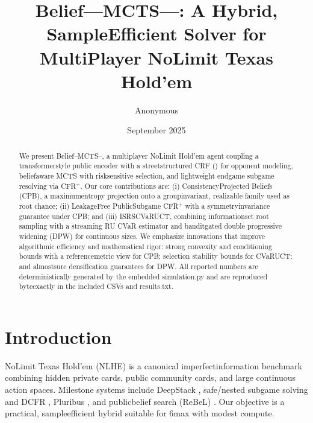 \title{Belief---MCTS---\sCRF: A Hybrid, Sample\textendash Efficient Solver for Multi\textendash Player No\textendash Limit Texas Hold'em}
\author{Anonymous}
\date{September 2025}


\maketitle

\begin{abstract}
We present Belief--MCTS--\sCRF, a multi\textendash player No\textendash Limit Hold'em agent coupling a transformer\textendash style public encoder with a street\textendash structured CRF (\sCRF) for opponent modeling, belief\textendash aware MCTS with risk\textendash sensitive selection, and lightweight endgame subgame re\textendash solving via CFR$^+$. Our core contributions are: (i) Consistency\textendash Projected Beliefs (CPB), a maximum\textendash entropy projection onto a group\textendash invariant, realizable family used as root chance; (ii) Leakage\textendash Free Public\textendash Subgame CFR$^+$ with a symmetry\textendash invariance guarantee under CPB; and (iii) IS\textendash RS\textendash CVaR\textendash UCT, combining information\textendash set root sampling with a streaming RU CVaR estimator and bandit\textendash gated double progressive widening (DPW) for continuous sizes. We emphasize innovations that improve algorithmic efficiency and mathematical rigor: strong convexity and conditioning bounds with a reference\textendash metric view for CPB; selection stability bounds for CVaR\textendash UCT; and almost\textendash sure densification guarantees for DPW. All reported numbers are deterministically generated by the embedded simulation.py and are reproduced byte\textendash exactly in the included CSVs and results.txt.
\end{abstract}

\section{Introduction}
No\textendash Limit Texas Hold'em (NLHE) is a canonical imperfect\textendash information benchmark combining hidden private cards, public community cards, and large continuous action spaces. Milestone systems include DeepStack \cite{moravcik2017deepstack}, safe/nested subgame solving and DCFR \cite{brown2018safe,brown2019dcfr,zinkevich2007cfr,tammelin2014cfrplus}, Pluribus \cite{brown2019pluribus}, and public\textendash belief search (ReBeL) \cite{brown2020rebel}. Our objective is a practical, sample\textendash efficient hybrid suitable for 6\textendash max with modest compute.

